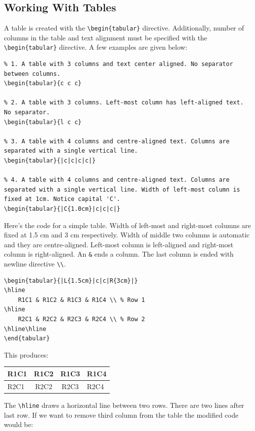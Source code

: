 \documentclass[12pt,a4paper]{article}
\begin{document}
\subsection{Working With Tables}
A table is created with the \verb|\begin{tabular}| directive. Additionally, number of columns in the table and text alignment must be specified with the \verb|\begin{tabular}| directive. A few examples are given below:
\lstset{language=TeX}
\begin{lstlisting}
% 1. A table with 3 columns and text center aligned. No separator between columns.
\begin{tabular}{c c c}

% 2. A table with 3 columns. Left-most column has left-aligned text. No separator.
\begin{tabular}{l c c}

% 3. A table with 4 columns and centre-aligned text. Columns are separated with a single vertical line.
\begin{tabular}{|c|c|c|c|}

% 4. A table with 4 columns and centre-aligned text. Columns are separated with a single vertical line. Width of left-most column is fixed at 1cm. Notice capital 'C'.
\begin{tabular}{|C{1.0cm}|c|c|c|}
\end{lstlisting}
Here's the code for a simple table. Width of left-most and right-most columns are fixed at 1.5 cm and 3 cm respectively. Width of middle two columns is automatic and they are centre-aligned. Left-most column is left-aligned and right-most column is right-aligned. An \verb|&| ends a column. The last column is ended with newline directive \verb|\\|.
\begin{lstlisting}
\begin{tabular}{|L{1.5cm}|c|c|R{3cm}|}
\hline
	R1C1 & R1C2 & R1C3 & R1C4 \\ % Row 1
\hline
	R2C1 & R2C2 & R2C3 & R2C4 \\ % Row 2
\hline\hline
\end{tabular}
\end{lstlisting}
This produces:
\begin{tabular}{|L{1.5cm}|c|c|R{3cm}|}
\hline
	R1C1 & R1C2 & R1C3 & R1C4 \\
\hline
	R2C1 & R2C2 & R2C3 & R2C4 \\
\hline\hline
\end{tabular}
The \verb|\hline| draws a horizontal line between two rows. There are two lines after last row. If we want to remove third column from the table the modified code would be:
\end{document}
